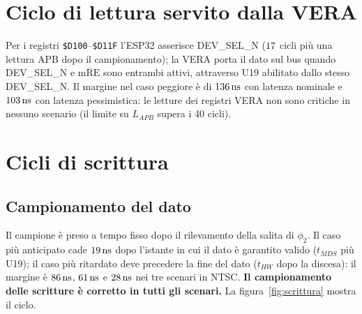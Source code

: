 \documentclass[11pt,a4paper,twoside,openright]{report}
\newcommand{\ns}{\,\mathrm{ns}}
\newcommand{\sig}[1]{\textsf{#1}}
\newcommand{\hex}[1]{\texttt{\$#1}}
\begin{document}
\section{Ciclo di lettura servito dalla VERA}

Per i registri \hex{D100}--\hex{D11F} l'ESP32 asserisce \sig{DEV\_SEL\_N} ($17$
cicli più una lettura APB dopo il campionamento); la VERA porta il dato sul bus quando
\sig{DEV\_SEL\_N} e $\overline{\text{mRE}}$ sono entrambi attivi, attraverso U19 abilitato
dallo stesso \sig{DEV\_SEL\_N}. Il margine nel caso peggiore è di $\NwSlVeraNomNTSC\ns$ con
latenza nominale e $\NwSlVeraPesNTSC\ns$ con latenza pessimistica: le letture dei registri
VERA non sono critiche in nessuno scenario (il limite su $L_{APB}$ supera i 40 cicli).

\section{Cicli di scrittura}

\subsection{Campionamento del dato}

Il campione è preso a tempo fisso dopo il rilevamento della salita di $\phi_2$. Il caso
più anticipato cade $\NwWrAOttNTSC\ns$ dopo l'istante in cui il dato è garantito valido
($t_{MDS}$ più U19); il caso più ritardato deve precedere la fine del dato ($t_{HW}$ dopo la
discesa): il margine è $\NwWrBOttNTSC\ns$, $\NwWrBNomNTSC\ns$ e $\NwWrBPesNTSC\ns$ nei tre
scenari in NTSC. \textbf{Il campionamento delle scritture è corretto in tutti gli scenari.}
La figura~\ref{fig:scrittura} mostra il ciclo.
\end{document}
